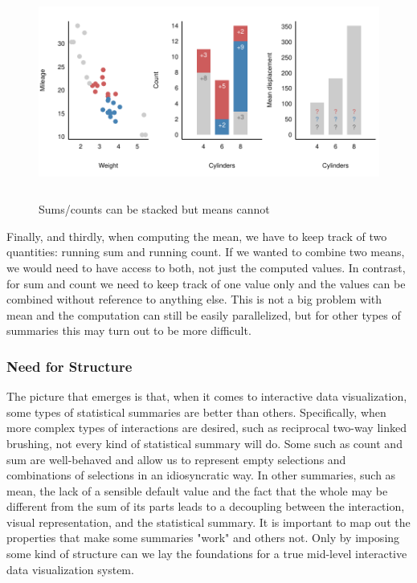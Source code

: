\documentclass[12pt,a4paper]{article}
\begin{document}
\begin{figure}[H]
\centering
\includegraphics[height=70mm]{./figure02.pdf}
\caption{Sums/counts can be stacked but means cannot}
\label{fig:stacking}
\end{figure}

Finally, and thirdly, when computing the mean, we have to keep track of two quantities: running sum and running count. If we wanted to combine two means, we would need to have access to both, not just the computed values. In contrast, for sum and count we need to keep track of one value only and the values can be combined without reference to anything else. This is not a big problem with mean and the computation can still be easily parallelized, but for other types of summaries this may turn out to be more difficult.

\subsubsection{Need for Structure}

The picture that emerges is that, when it comes to interactive data visualization, some types of statistical summaries are better than others. Specifically, when more complex types of interactions are desired, such as reciprocal two-way linked brushing, not every kind of statistical summary will do. Some such as count and sum are well-behaved and allow us to represent empty selections and combinations of selections in an idiosyncratic way. In other summaries, such as mean, the lack of a sensible default value and the fact that the whole may be different from the sum of its parts leads to a decoupling between the interaction, visual representation, and the statistical summary. It is important to map out the properties that make some summaries "work" and others not. Only by imposing some kind of structure can we lay the foundations for a true mid-level interactive data visualization system. 
\end{document}
